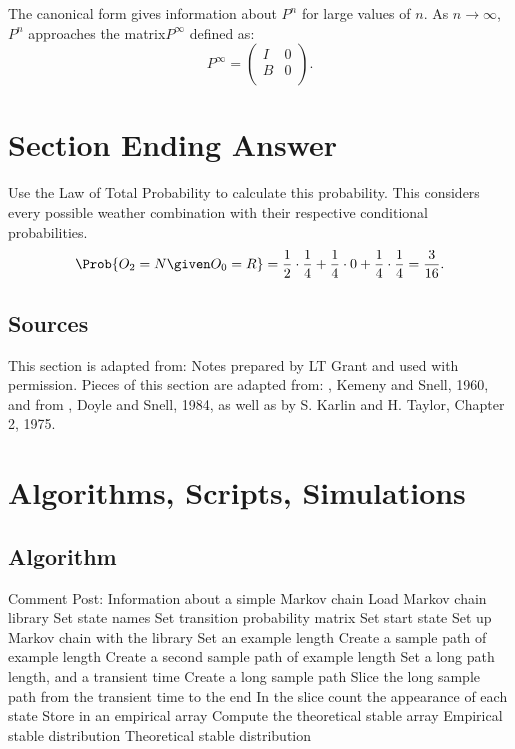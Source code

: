 \documentclass[12pt]{article}
\begin{document}
The canonical form gives information  about \( P^n \) for large values of \( n \).
As \( n\to\infty \), \( P^n \) approaches the matrix\( P^\infty \)
defined as:
\[
    P^\infty =
    \begin{pmatrix}
        I & 0 \\
        B & 0 \\
    \end{pmatrix}
    .
\]

\hr

\section*{Section Ending Answer}

Use the Law of Total Probability to
calculate this probability.  This considers every possible weather
combination with their respective conditional probabilities.
\[
    \Prob{O_2 = N \given O_0 = R} = \frac{1}{2} \cdot \frac{1}{4} +
    \frac{1}{4} \cdot 0 + \frac{1}{4} \cdot \frac{1}{4} = \frac{3}{16}.
\]

\subsection*{Sources}

This section is adapted from:  Notes prepared by LT Grant and used with
permission.  Pieces of this section are adapted from:  , Kemeny and Snell, 1960, and from , Doyle and Snell, 1984, as well as  by S. Karlin and H. Taylor,
Chapter 2, 1975.

\hr

\section*{Algorithms, Scripts, Simulations}

\subsection*{Algorithm}

\begin{codebox}
     \zi Comment Post:  
    Information about a simple Markov chain \li Load Markov chain
    library \li Set state names \li Set transition probability matrix
    \li Set start state \li Set up Markov chain with the library \li Set
    an example length \li Create a sample path of example length \li
    Create a second sample path of example length \li Set a long path
    length, and a transient time \li Create a long sample path \li Slice
    the long sample path from the transient time to the end \li In the
    slice count the appearance of each state \li Store in an empirical
    array \li Compute the theoretical stable array \li \Return Empirical
    stable distribution \li \Return Theoretical stable distribution
\end{codebox}
\end{document}
